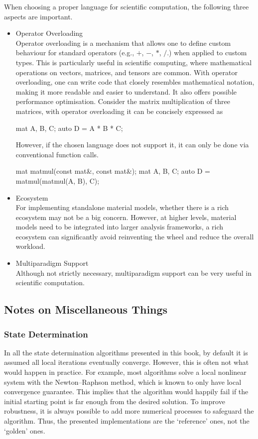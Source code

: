 When choosing a proper language for scientific computation, the following three aspects are important.
\begin{itemize}
\item Operator Overloading\\
Operator overloading is a mechanism that allows one to define custom behaviour for standard operators (e.g., $+$, $-$, $*$, $/$.) when applied to custom types.
This is particularly useful in scientific computing, where mathematical operations on vectors, matrices, and tensors are common.
With operator overloading, one can write code that closely resembles mathematical notation, making it more readable and easier to understand.
It also offers possible performance optimisation.
Consider the matrix multiplication of three matrices, with operator overloading it can be concisely expressed as
\begin{cppcode}
    mat A, B, C;
    auto D = A * B * C;
\end{cppcode}
However, if the chosen language does not support it, it can only be done via conventional function calls.
\begin{cppcode}
    mat matmul(const mat&, const mat&);
    mat A, B, C;
    auto D = matmul(matmul(A, B), C);
\end{cppcode}
\item Ecosystem\\
For implementing standalone material models, whether there is a rich ecosystem may not be a big concern.
However, at higher levels, material models need to be integrated into larger analysis frameworks, a rich ecosystem can significantly avoid reinventing the wheel and reduce the overall workload.
\item Multiparadigm Support\\
Although not strictly necessary, multiparadigm support can be very useful in scientific computation.
\end{itemize}
\subsection{Notes on Miscellaneous Things}
\subsubsection{State Determination}
In all the state determination algorithms presented in this book, by default it is assumed all local iterations eventually converge.
However, this is often not what would happen in practice.
For example, most algorithms solve a local nonlinear system with the Newton--Raphson method, which is known to only have local convergence guarantee.
This implies that the algorithm would happily fail if the initial starting point is far enough from the desired solution.
To improve robustness, it is always possible to add more numerical processes to safeguard the algorithm.
Thus, the presented implementations are the `reference' ones, not the `golden' ones.

